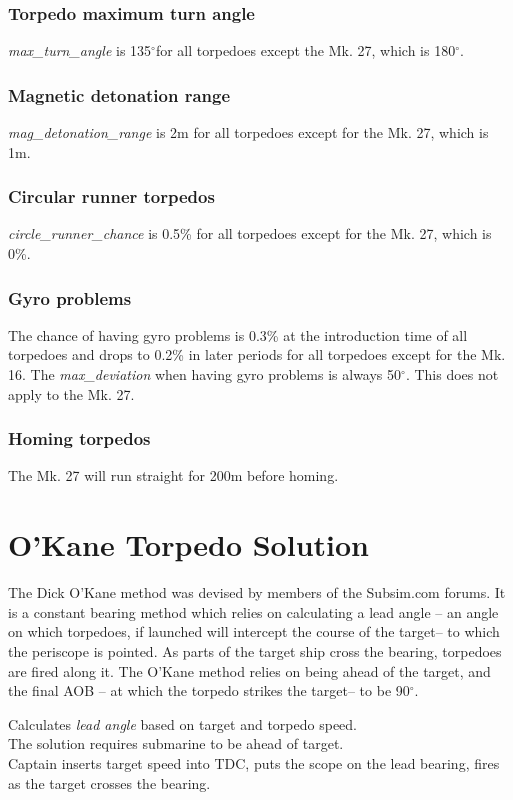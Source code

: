 \documentclass{article}
\newcommand{\degree}{$^{\circ}$}
\begin{document}
\subsubsection{Torpedo maximum turn angle}
\emph{max\_turn\_angle} is 135\degree for all torpedoes except the Mk. 27, which is 180\degree.

\subsubsection{Magnetic detonation range}
\emph{mag\_detonation\_range} is 2m for all torpedoes except for the Mk. 27, which is 1m.

\subsubsection{Circular runner torpedos}
\emph{circle\_runner\_chance} is 0.5\% for all torpedoes except for the Mk. 27, which is 0\%.

\subsubsection{Gyro problems}
The chance of having gyro problems is 0.3\% at the introduction time of all torpedoes and drops to 0.2\% in later periods for all torpedoes except for the Mk. 16. The \emph{max\_deviation} when having gyro problems is always 50\degree. This does not apply to the Mk. 27. 

\subsubsection{Homing torpedos}
The Mk. 27 will run straight for 200m before homing.



\section{O'Kane Torpedo Solution}
The Dick O'Kane method was devised by members of the Subsim.com forums. It is a constant bearing method which relies on calculating a lead angle -- an angle on which torpedoes, if launched will intercept the course of the target-- to which the periscope is pointed. As parts of the target ship cross the bearing, torpedoes are fired along it. The O'Kane method relies on being ahead of the target, and the final AOB -- at which the torpedo strikes the target-- to be 90\degree .

Calculates \emph{lead angle} based on target and torpedo speed.\\
The solution requires submarine to be ahead of target.\\
Captain inserts target speed into TDC, puts the scope on the lead bearing, fires as the target crosses the bearing.
\end{document}
